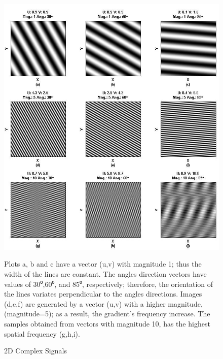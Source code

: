\documentclass[12pt,a4paper]{article}
\begin{document}
\begin{figure}
  \includegraphics[width=\linewidth]{FiguresDisertation/figure1.jpg}
  \caption{2D Complex Signals}
  \medskip
  \small
  Plots a, b and c have a vector (u,v) with magnitude 1; thus the width of the lines are constant. The angles direction vectors have values of 30⁰,60⁰, and 85⁰, respectively; therefore, the orientation of the lines variates perpendicular to the angles directions. Images (d,e,f) are generated by a vector (u,v)  with a higher magnitude,(magnitude=5); as a result, the gradient's frequency increase. The samples obtained from vectors with magnitude 10, has the highest spatial frequency (g,h,i).
\end{figure}
\end{document}
